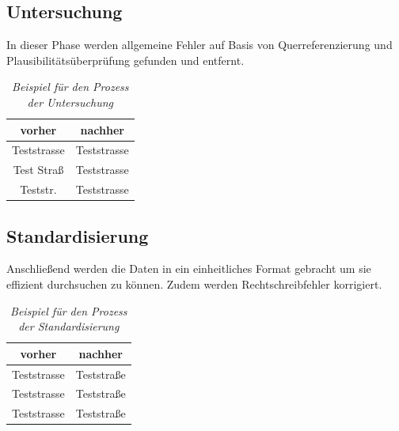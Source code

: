 \documentclass[twoside,a4paper]{article}
\begin{document}
\subsection{Untersuchung}
In dieser Phase werden allgemeine Fehler auf Basis von Querreferenzierung und Plausibilitätsüberprüfung gefunden und entfernt.
\begin{table}[htdp]
  \caption{\it Beispiel für den Prozess der Untersuchung}
  \begin{center}
    \begin{tabular}{|c|c|}\hline
      \textbf{vorher} 	& \textbf{nachher} \\\hline
      Teststrasse & Teststrasse\\
      Test Straß & Teststrasse\\
      Teststr. & Teststrasse\\	  
     \hline
    \end{tabular}
  \end{center}
\end{table}

\subsection{Standardisierung}
\label{sub:Standardisierung}
Anschließend werden die Daten in ein einheitliches Format gebracht um sie effizient durchsuchen zu können. Zudem werden Rechtschreibfehler korrigiert.
\begin{table}[htdp]
  \caption{\it Beispiel für den Prozess der Standardisierung}
  \begin{center}
    \begin{tabular}{|c|c|}\hline
      \textbf{vorher} 	& \textbf{nachher} \\\hline
      Teststrasse & Teststraße\\
      Teststrasse & Teststraße\\
      Teststrasse & Teststraße\\	  
     \hline
    \end{tabular}
  \end{center}
\end{table}
\end{document}
